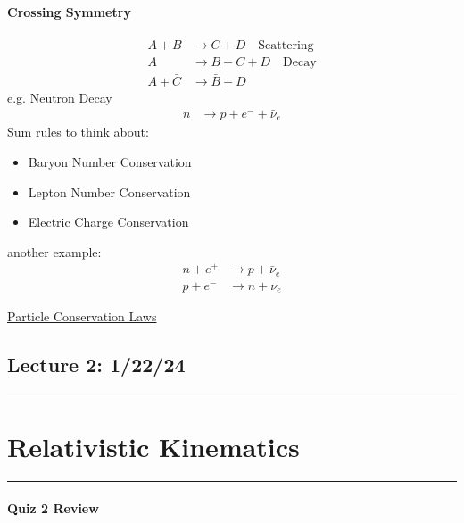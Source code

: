 \documentclass[../main.tex]{subfiles}
\begin{document}
\paragraph{Crossing Symmetry}
\begin{align*}
    A + B &\rightarrow C + D \quad \textrm{Scattering} \\
    A &\rightarrow B + C + D \quad \textrm{Decay} \\
    A + \bar C &\rightarrow \bar B + D
\end{align*}
e.g. Neutron Decay
\begin{align*}
    n &\rightarrow p + e^- + \bar \nu_e 
\end{align*}
Sum rules to think about:
\begin{itemize}
    \item Baryon Number Conservation
    \item Lepton Number Conservation
    \item Electric Charge Conservation
\end{itemize}
another example:
\begin{align*}
    n + e^+ &\rightarrow p + \bar \nu_e \\
    p + e^- &\rightarrow n + \nu_e
\end{align*}

\href{https://phys.libretexts.org/Bookshelves/University_Physics/University_Physics_(OpenStax)/University_Physics_III_-_Optics_and_Modern_Physics_(OpenStax)/11%3A_Particle_Physics_and_Cosmology/11.03%3A_Particle_Conservation_Laws}{Particle Conservation Laws}

\newpage
\subsection*{Lecture 2: \hfill  1/22/24}
\hrule \vspace{10px}
\section{Relativistic Kinematics}
\hrule \vspace{10px}

\paragraph{Quiz 2 Review}
\end{document}
